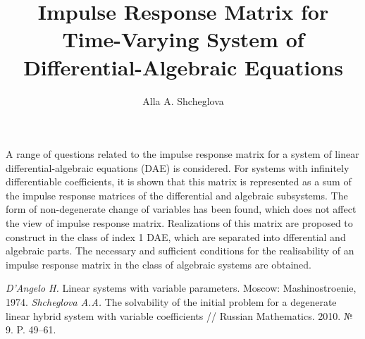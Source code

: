 \title{Impulse Response Matrix for Time-Varying System of Differential-Algebraic Equations}
\author{Alla A. Shcheglova}


\maketitle

\begin{abstract}
\end{abstract}


A range of questions related to the impulse response matrix \cite{reff1} for a system of linear differential-algebraic equations (DAE) \cite{reff2} is considered. For systems with infinitely differentiable coefficients, it is shown that this matrix is represented as a sum of the impulse response matrices of the differential and algebraic subsystems.  The form of  non-degenerate change of variables has been found, which does not affect the view of impulse response matrix.  Realizations of this matrix are proposed to construct  in the class of index 1 DAE, which are separated into dfferential and algebraic parts. The necessary and sufficient conditions for the realisability  of an impulse response matrix in the class of algebraic systems are obtained.

\begin{thebibliography}{9}
{\sl D'Angelo H.} Linear systems with variable parameters.  Moscow:  Mashinostroenie, 1974.  
{\sl Shcheglova A.A.} The solvability of the initial problem for a degenerate linear hybrid system with variable coefficients // Russian Mathematics.  2010. № 9.  P. 49--61.  
\end{thebibliography}
